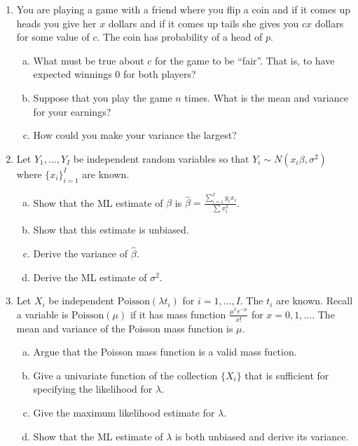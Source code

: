 \documentclass[12pt]{article}
\begin{document}
\begin{enumerate}[1.]

\item You are playing a game with a friend where you flip a coin and if it comes up heads you give her  $x$ dollars and if it comes up tails she gives you $cx$ dollars for some value of $c$.  The coin has probability of a head of $p$.
\begin{enumerate}[a.]
\item What must be true about $c$ for the game to be ``fair''. That is, to have expected winnings 0 for both players?
\item Suppose that you play the game $n$ times. What is the mean and variance
for your earnings?
\item How could you make your variance the largest? 
\end{enumerate}

\newpage

\item Let $Y_1,\ldots, Y_I$ be independent random variables so that
$Y_i \sim N(x_i \beta, \sigma^2)$ where $\{x_i\}_{i=1}^I$ are known.
\begin{enumerate}[a.]
\item Show that the ML estimate of $\beta$ is $\hat \beta = \frac{\sum_{i=1}^I y_i x_i}{\sum x_i^2}$.
\item Show that this estimate is unbiased. 
\item Derive the variance of $\hat \beta$.
\item Derive the ML estimate of $\sigma^2$.
\end{enumerate}

\newpage

\item Let $X_i$ be independent $\mbox{Poisson}(\lambda t_i)$ for $i = 1,\ldots, I$. The $t_i$ are known. Recall a variable is $\mbox{Poisson}(\mu)$ if it has mass function 
$\frac{\mu^x e^{-\mu}}{x!}$ for $x=0,1,\ldots$. The mean and variance of
the Poisson mass function is $\mu$.
\begin{enumerate}[a.]
\item Argue that the Poisson mass function is a valid mass fuction.
\item Give a univariate function of the collection $\{X_i\}$ that is 
sufficient for specifying the likelihood for $\lambda$.
\item Give the maximum likelihood estimate for $\lambda$.
\item Show that the ML estimate of $\lambda$ is both unbiased and 
derive its variance.
\end{enumerate}


\end{enumerate}
\end{document}
